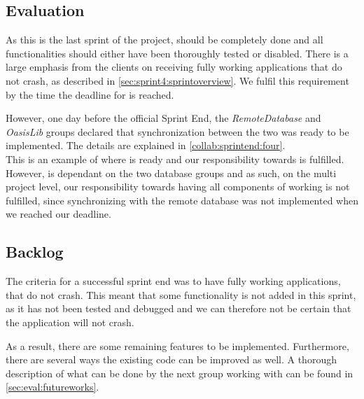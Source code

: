 \subsection{Evaluation}

As this is the last sprint of the project, \launcher should be completely done and all functionalities should either have been thoroughly tested or disabled.
There is a large emphasis from the clients on receiving  fully working applications that do not crash, as described in \cref{sec:sprint4:sprintoverview}.
We fulfil this requirement by the time the deadline for \launcher is reached.

However, one day before the official Sprint End, the \textit{RemoteDatabase} and \textit{OasisLib} groups declared that synchronization between the two was ready to be implemented.
The details are explained in \cref{collab:sprintend:four}.\\

This is an example of where \launcher is ready and our responsibility towards \launcher is fulfilled.
However, \launcher is dependant on the two database groups and as such, on the multi project level, our responsibility towards having all components of \launcher working is not fulfilled, since synchronizing with the remote database was not implemented when we reached our deadline.

\subsection{Backlog}

The criteria for a successful sprint end was to have fully working applications, that do not crash.
This meant that some functionality is not added in this sprint, as it has not been tested and debugged and we can therefore not be certain that the application will not crash.

As a result, there are some remaining features to be implemented.
Furthermore, there are several ways the existing code can be improved as well.
A thorough description of what can be done by the next group working with \launcher can be found in \cref{sec:eval:futureworks}.